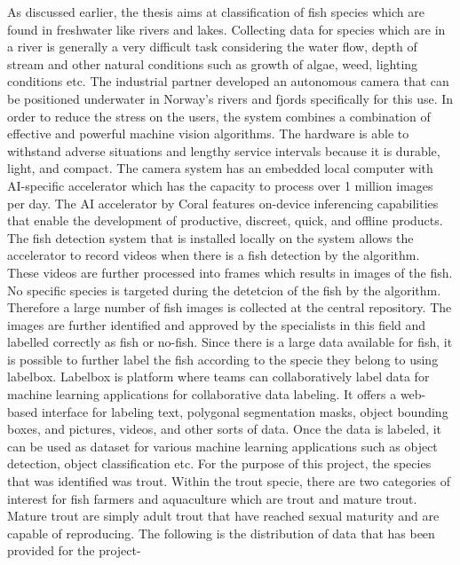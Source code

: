 \noindent As discussed earlier, the thesis aims at classification of fish species which are found in freshwater like rivers and lakes. Collecting data for species which are in a river is generally a very difficult task considering the water flow, depth of stream and other natural conditions such as growth of algae, weed, lighting conditions etc. The industrial partner developed an autonomous camera that can be positioned underwater in Norway's rivers and fjords specifically for this use. In order to reduce the stress on the users, the system combines a combination of effective and powerful machine vision algorithms. The hardware is able to withstand adverse situations and lengthy service intervals because it is durable, light, and compact. The camera system has an embedded local computer with AI-specific accelerator which has the capacity to process over 1 million images per day. The AI accelerator by Coral features on-device inferencing capabilities that enable the development of productive, discreet, quick, and offline products. The fish detection system that is installed locally on the system allows the accelerator to record videos when there is a fish detection by the algorithm. These videos are further processed into frames which results in images of the fish. No specific species is targeted during the detetcion of the fish by the algorithm. Therefore a large number of fish images is collected at the central repository. The images are further identified and approved by the specialists in this field and labelled correctly as fish or no-fish. Since there is a large data available for fish, it is possible to further label the fish according to the specie they belong to using labelbox. Labelbox is platform where teams can collaboratively label data for machine learning applications for collaborative data labeling. It offers a web-based interface for labeling text, polygonal segmentation masks, object bounding boxes, and pictures, videos, and other sorts of data. Once the data is labeled, it can be used as dataset for various machine learning applications such as object detection, object classification etc. For the purpose of this project, the species that was identified was trout. Within the trout specie, there are two categories of interest for fish farmers and aquaculture which are trout and mature trout. Mature trout are simply adult trout that have reached sexual maturity and are capable of reproducing. The following is the distribution of data that has been provided for the project-

